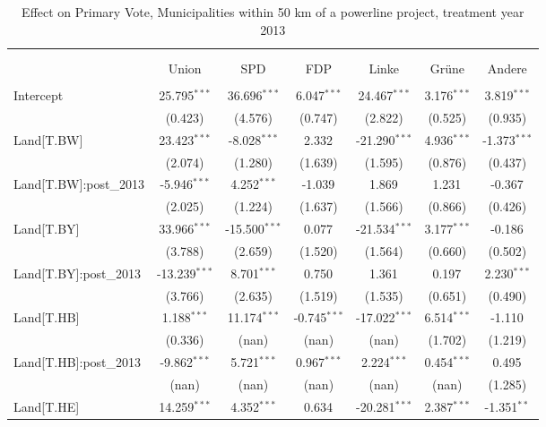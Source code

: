 \begin{table}[!htbp] \centering
  \caption{Effect on Primary Vote, Municipalities within 50 km of a powerline project, treatment year 2013}
\begin{tabular}{@{\extracolsep{5pt}}lcccccc}
\\[-1.8ex]\hline
\hline \\[-1.8ex]
\\[-1.8ex] & \multicolumn{1}{c}{Union} & \multicolumn{1}{c}{SPD} & \multicolumn{1}{c}{FDP} & \multicolumn{1}{c}{Linke} & \multicolumn{1}{c}{Grüne} & \multicolumn{1}{c}{Andere}  \\
\hline \\[-1.8ex]
 Intercept & 25.795$^{***}$ & 36.696$^{***}$ & 6.047$^{***}$ & 24.467$^{***}$ & 3.176$^{***}$ & 3.819$^{***}$ \\
  & (0.423) & (4.576) & (0.747) & (2.822) & (0.525) & (0.935) \\
 Land[T.BW] & 23.423$^{***}$ & -8.028$^{***}$ & 2.332$^{}$ & -21.290$^{***}$ & 4.936$^{***}$ & -1.373$^{***}$ \\
  & (2.074) & (1.280) & (1.639) & (1.595) & (0.876) & (0.437) \\
 Land[T.BW]:post_2013 & -5.946$^{***}$ & 4.252$^{***}$ & -1.039$^{}$ & 1.869$^{}$ & 1.231$^{}$ & -0.367$^{}$ \\
  & (2.025) & (1.224) & (1.637) & (1.566) & (0.866) & (0.426) \\
 Land[T.BY] & 33.966$^{***}$ & -15.500$^{***}$ & 0.077$^{}$ & -21.534$^{***}$ & 3.177$^{***}$ & -0.186$^{}$ \\
  & (3.788) & (2.659) & (1.520) & (1.564) & (0.660) & (0.502) \\
 Land[T.BY]:post_2013 & -13.239$^{***}$ & 8.701$^{***}$ & 0.750$^{}$ & 1.361$^{}$ & 0.197$^{}$ & 2.230$^{***}$ \\
  & (3.766) & (2.635) & (1.519) & (1.535) & (0.651) & (0.490) \\
 Land[T.HB] & 1.188$^{***}$ & 11.174$^{***}$ & -0.745$^{***}$ & -17.022$^{***}$ & 6.514$^{***}$ & -1.110$^{}$ \\
  & (0.336) & (nan) & (nan) & (nan) & (1.702) & (1.219) \\
 Land[T.HB]:post_2013 & -9.862$^{***}$ & 5.721$^{***}$ & 0.967$^{***}$ & 2.224$^{***}$ & 0.454$^{***}$ & 0.495$^{}$ \\
  & (nan) & (nan) & (nan) & (nan) & (nan) & (1.285) \\
 Land[T.HE] & 14.259$^{***}$ & 4.352$^{***}$ & 0.634$^{}$ & -20.281$^{***}$ & 2.387$^{***}$ & -1.351$^{**}$ \\

\end{tabular}
\end{table}
